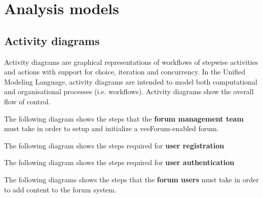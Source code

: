 \documentclass[12pt]{report}
\renewcommand\emph{\textbf}
\begin{document}
        \section{Analysis models}
            \subsection{Activity diagrams}
                Activity diagrams are graphical representations of workflows of stepwise activities and actions with support for choice, iteration and concurrency.
                In the Unified Modeling Language, activity diagrams are intended to model both computational and organisational processes (i.e. workflows).
                Activity diagrams show the overall flow of control.

                \newpage

                The following diagram shows the steps that the \emph{forum management team} must take in order to setup and initialize a veeForum-enabled forum.


                \newpage

                The following diagram shows the steps required for \emph{user registration}


                \newpage

                The following diagram shows the steps required for \emph{user authentication}


                \newpage

                The following diagrams shows the steps that the \emph{forum users} must take in order to add content to the forum system.
\end{document}
